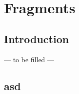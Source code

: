 \chapter{Fragments}
\label{FRAG}

\section{Introduction}
\label{FRAG:introduction}
--- to be filled ---

\section{asd}